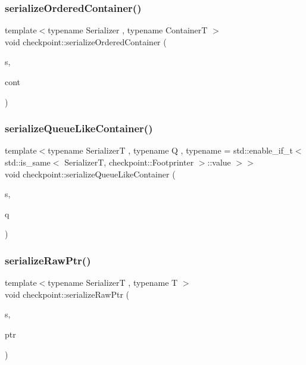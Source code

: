 \subsubsection{\texorpdfstring{serialize\+Ordered\+Container()}{serializeOrderedContainer()}}
{\footnotesize\ttfamily template$<$typename Serializer , typename ContainerT $>$ \\
void checkpoint\+::serialize\+Ordered\+Container (\begin{DoxyParamCaption}\item[{Serializer \&}]{s,  }\item[{ContainerT \&}]{cont }\end{DoxyParamCaption})\hspace{0.3cm}{\ttfamily [inline]}}

\mbox{\label{namespacecheckpoint_a33956387419a85cfe810fbce88f5bdf9}} 
\subsubsection{\texorpdfstring{serialize\+Queue\+Like\+Container()}{serializeQueueLikeContainer()}}
{\footnotesize\ttfamily template$<$typename SerializerT , typename Q , typename  = std\+::enable\+\_\+if\+\_\+t$<$    std\+::is\+\_\+same$<$      Serializer\+T,      checkpoint\+::\+Footprinter    $>$\+::value  $>$$>$ \\
void checkpoint\+::serialize\+Queue\+Like\+Container (\begin{DoxyParamCaption}\item[{SerializerT \&}]{s,  }\item[{const Q \&}]{q }\end{DoxyParamCaption})}

\mbox{\label{namespacecheckpoint_a6113644a35f5023a57e2ed3ca4814490}} 
\subsubsection{\texorpdfstring{serialize\+Raw\+Ptr()}{serializeRawPtr()}\hspace{0.1cm}{\footnotesize\ttfamily [1/2]}}
{\footnotesize\ttfamily template$<$typename SerializerT , typename T $>$ \\
void checkpoint\+::serialize\+Raw\+Ptr (\begin{DoxyParamCaption}\item[{SerializerT \&}]{s,  }\item[{T $\ast$}]{ptr }\end{DoxyParamCaption})}

